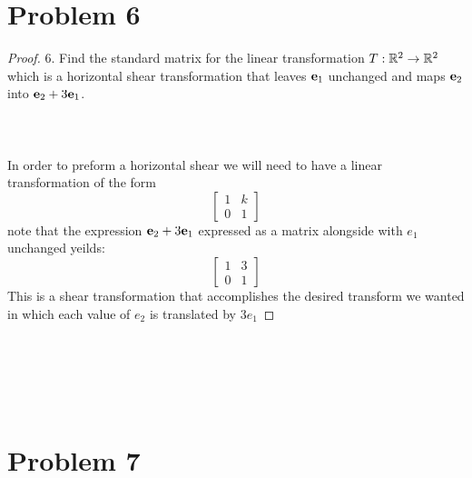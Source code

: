 \documentclass[12pt]{article}
\newcommand{\tab}{\\\\}
\newcommand{\sect}[1]{\section*{#1}}
\begin{document}
\sect{Problem 6}
\begin{proof}
  6. Find the standard matrix for the linear transformation $T: {\Bbb R}^2 \rightarrow {\Bbb R}^2$
  which is a horizontal shear transformation that leaves ${\bf e}_1$ unchanged and maps
  ${\bf e}_2$ into ${\bf e}_2 + 3{\bf e}_1$.
  \tab\tab
  In order to preform a horizontal shear we will need to have a linear transformation of the form
  \[
    \begin{bmatrix}
      1&k\\0&1
    \end{bmatrix}
  \]
  note that the expression ${\bf e}_2 + 3{\bf e}_1$ expressed as a matrix alongside with $e_1$ unchanged yeilds:
  \[
  \begin{bmatrix}
    1&3\\0&1
  \end{bmatrix}
  \]
  This is a shear transformation that accomplishes the desired transform we wanted in which each value of $e_2$ is translated by $3e_1$
  \noindent
\end{proof}\tab\tab
\sect{Problem 7}
\end{document}
